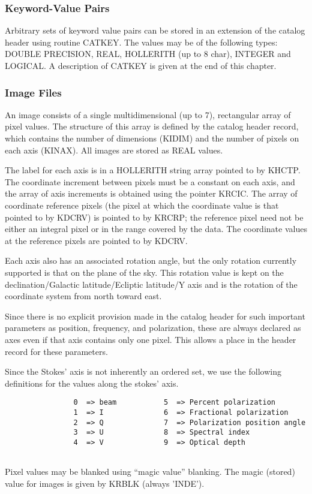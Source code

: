 \subsubsection{Keyword-Value Pairs}

   Arbitrary sets of keyword value pairs can be stored in an extension
of the catalog header using routine CATKEY.  The values may be of the
following types: DOUBLE PRECISION, REAL, HOLLERITH (up to 8 char),
INTEGER and LOGICAL.  A description of CATKEY is given at the end of
this chapter.

\subsubsection{Image Files}
An image consists of a single multidimensional (up to 7), rectangular
array of pixel values.  The structure of this array is defined by the
catalog header record, which contains the number of dimensions
(KIDIM) and the number of pixels on each axis (KINAX).  All images are
stored as REAL values.

The label for each axis is in a HOLLERITH string array pointed
to by KHCTP.  The coordinate increment between pixels must be a
constant on each axis, and the array of axis increments is obtained
using the pointer KRCIC.  The array of coordinate reference pixels
(the pixel at which the coordinate value is that pointed to by KDCRV)
is pointed to by KRCRP; the reference pixel need not be either an
integral pixel or in the range covered by the data.  The coordinate
values at the reference pixels are pointed to by KDCRV.

Each axis also has an associated rotation angle, but the only rotation
currently supported is that on the plane of the sky.  This rotation
value is kept on the declination/Galactic latitude/Ecliptic latitude/Y
axis and is the rotation of the coordinate system from north toward
east.

Since there is no explicit provision made in the catalog header for
such important parameters as position, frequency, and polarization,
these are always declared as axes even if that axis contains only one
pixel.  This allows a place in the header record for these parameters.

Since the Stokes' axis is not inherently an ordered set, we use the
following definitions for the values along the stokes' axis.

\begin{verbatim}
                0  => beam           5  => Percent polarization
                1  => I              6  => Fractional polarization
                2  => Q              7  => Polarization position angle
                3  => U              8  => Spectral index
                4  => V              9  => Optical depth


\end{verbatim}
Pixel values may be blanked using ``magic value'' blanking.  The magic
(stored) value for images is given by KRBLK (always 'INDE').

